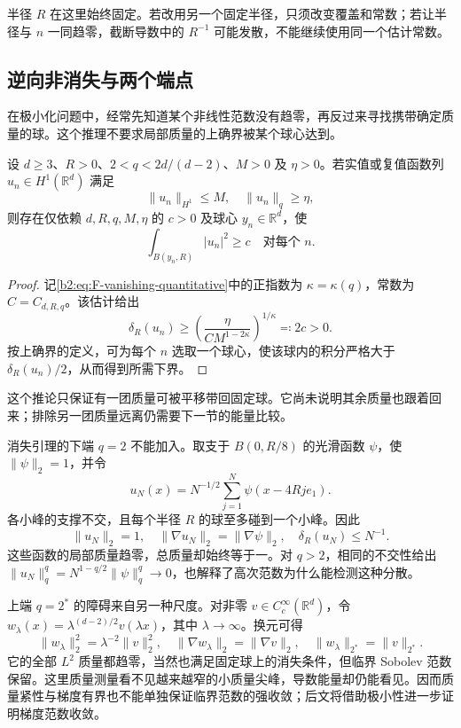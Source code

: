 半径 \(R\) 在这里始终固定。若改用另一个固定半径，只须改变覆盖和常数；若让半径与 \(n\) 一同趋零，截断导数中的 \(R^{-1}\) 可能发散，不能继续使用同一个估计常数。

\subsection{逆向非消失与两个端点}

\label{b2:subsec:F-inverse-vanishing}

在极小化问题中，经常先知道某个非线性范数没有趋零，再反过来寻找携带确定质量的球。这个推理不要求局部质量的上确界被某个球心达到。

\begin{corollary}[定量非消失]
\label{b2:cor:F-nonvanishing}
设 \(d\ge3\)、\(R>0\)、\(2<q<2d/(d-2)\)、\(M>0\) 及 \(\eta>0\)。若实值或复值函数列 \(u_n\in H^1(\mathbb R^d)\) 满足
\[
 \|u_n\|_{H^1}\le M,
 \quad \|u_n\|_q\ge\eta,
\]
则存在仅依赖 \(d,R,q,M,\eta\) 的 \(c>0\) 及球心 \(y_n\in\mathbb R^d\)，使
\[
 \int_{B(y_n,R)}|u_n|^2\ge c
 \quad\text{对每个 }n.
\]
\end{corollary}
\begin{proof}
记\eqref{b2:eq:F-vanishing-quantitative}中的正指数为 \(\kappa=\kappa(q)\)，常数为 \(C=C_{d,R,q}\)。该估计给出
\[
 \delta_R(u_n)\ge
 \left(\frac{\eta}{C M^{1-2\kappa}}\right)^{1/\kappa}
 \eqqcolon2c>0.
\]
按上确界的定义，可为每个 \(n\) 选取一个球心，使该球内的积分严格大于 \(\delta_R(u_n)/2\)，从而得到所需下界。
\end{proof}

这个推论只保证有一团质量可被平移带回固定球。它尚未说明其余质量也跟着回来；排除另一团质量远离仍需要下一节的能量比较。

\ProseParagraphBreak
消失引理的下端 \(q=2\) 不能加入。取支于 \(B(0,R/8)\) 的光滑函数 \(\psi\)，使 \(\|\psi\|_2=1\)，并令
\[
 u_N(x)=N^{-1/2}\sum_{j=1}^N\psi(x-4Rj e_1).
\]
各小峰的支撑不交，且每个半径 \(R\) 的球至多碰到一个小峰。因此
\[
 \|u_N\|_2=1,
 \quad \|\nabla u_N\|_2=\|\nabla\psi\|_2,
 \quad \delta_R(u_N)\le N^{-1}.
\]
这些函数的局部质量趋零，总质量却始终等于一。对 \(q>2\)，相同的不交性给出
\(\|u_N\|_q^q=N^{1-q/2}\|\psi\|_q^q\to0\)，也解释了高次范数为什么能检测这种分散。

\ProseParagraphBreak
上端 \(q=2^*\) 的障碍来自另一种尺度。对非零 \(v\in C_c^\infty(\mathbb R^d)\)，令
\(w_\lambda(x)=\lambda^{(d-2)/2}v(\lambda x)\)，其中 \(\lambda\to\infty\)。换元可得
\[
 \|w_\lambda\|_2^2=\lambda^{-2}\|v\|_2^2,
 \quad \|\nabla w_\lambda\|_2=\|\nabla v\|_2,
 \quad \|w_\lambda\|_{2^*}=\|v\|_{2^*}.
\]
它的全部 \(L^2\) 质量都趋零，当然也满足固定球上的消失条件，但临界 Sobolev 范数保留。这里质量测量看不见越来越窄的小质量尖峰，导数能量却仍能看见。因而质量紧性与梯度有界也不能单独保证临界范数的强收敛；后文将借助极小性进一步证明梯度范数收敛。

